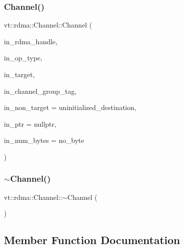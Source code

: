 \subsubsection{\texorpdfstring{Channel()}{Channel()}}
{\footnotesize\ttfamily vt\+::rdma\+::\+Channel\+::\+Channel (\begin{DoxyParamCaption}\item[{\hyperlink{namespacevt_a10442579ec4e7ebef223818e64bcf908}{R\+D\+M\+A\+\_\+\+Handle\+Type} const \&}]{in\+\_\+rdma\+\_\+handle,  }\item[{\hyperlink{namespacevt_1_1rdma_ac848e1d9da43db6294bd06f83e5d3946}{R\+D\+M\+A\+\_\+\+Type\+Type} const \&}]{in\+\_\+op\+\_\+type,  }\item[{\hyperlink{namespacevt_a866da9d0efc19c0a1ce79e9e492f47e2}{Node\+Type} const \&}]{in\+\_\+target,  }\item[{\hyperlink{namespacevt_a84ab281dae04a52a4b243d6bf62d0e52}{Tag\+Type} const \&}]{in\+\_\+channel\+\_\+group\+\_\+tag,  }\item[{\hyperlink{namespacevt_a866da9d0efc19c0a1ce79e9e492f47e2}{Node\+Type} const \&}]{in\+\_\+non\+\_\+target = {\ttfamily uninitialized\+\_\+destination},  }\item[{\hyperlink{namespacevt_a9e2c953286c7616f7c218e9951790776}{R\+D\+M\+A\+\_\+\+Ptr\+Type} const \&}]{in\+\_\+ptr = {\ttfamily nullptr},  }\item[{\hyperlink{namespacevt_aab8d55968084610ce3b17057981e9300}{Byte\+Type} const \&}]{in\+\_\+num\+\_\+bytes = {\ttfamily no\+\_\+byte} }\end{DoxyParamCaption})}

\mbox{\label{structvt_1_1rdma_1_1_channel_a4e32f293df8c7d988a080065647c4253}} 
\subsubsection{\texorpdfstring{$\sim$\+Channel()}{~Channel()}}
{\footnotesize\ttfamily vt\+::rdma\+::\+Channel\+::$\sim$\+Channel (\begin{DoxyParamCaption}{ }\end{DoxyParamCaption})\hspace{0.3cm}{\ttfamily [virtual]}}



\subsection{Member Function Documentation}
\mbox{\label{structvt_1_1rdma_1_1_channel_a0e68ef1830979531a430f2a9b0206afb}} 
